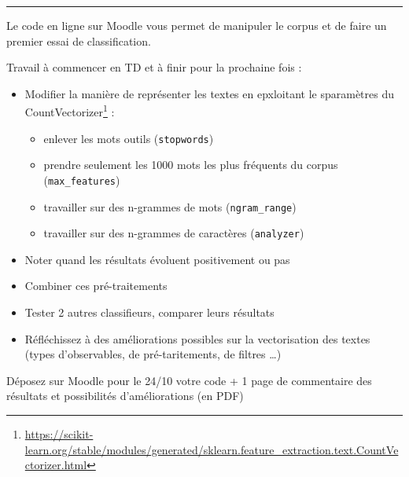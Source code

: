 
\newcommand{\numTD}{TD5}
\newcommand{\themeTD}{Classifier des chansons}



\hrule

\noindent{}

\vspace{3cm}
Le code en ligne sur Moodle vous permet de manipuler le corpus et de faire un premier essai de classification.

Travail à commencer en TD et à finir pour la prochaine fois :

\begin{itemize}
  \item Modifier la manière de représenter les textes en epxloitant le sparamètres du CountVectorizer\footnote{\url{https://scikit-learn.org/stable/modules/generated/sklearn.feature_extraction.text.CountVectorizer.html}} :
  \begin{itemize}
    \item enlever les mots outils (\texttt{stopwords})
    \item prendre seulement les 1000 mots les plus fréquents du corpus (\texttt{max\_features})
    \item travailler sur des n-grammes de mots (\texttt{ngram\_range})
    \item travailler sur des n-grammes de caractères (\texttt{analyzer})
  \end{itemize}
  \item Noter quand les résultats évoluent positivement ou pas
  \item Combiner ces pré-traitements
  \item Tester 2 autres classifieurs, comparer leurs résultats
  \item Réfléchissez à des améliorations possibles sur la vectorisation des textes (types d'observables, de pré-taritements, de filtres \dots)
\end{itemize}

Déposez sur Moodle pour le 24/10 votre code + 1 page de commentaire des résultats et possibilités d'améliorations (en PDF)
